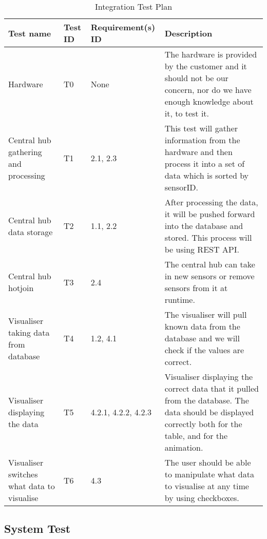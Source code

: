 \documentclass[../document]{subfiles}
\begin{document}
\begin{table}[H]
\caption{Integration Test Plan}
\centering
\begin{tabularx}{\textwidth}{|L{2cm}|l|L{2.2cm}|X|}
	\hline
	Test name
	&Test ID
	&Requirement(s) ID
	&Description
	\\ \hline Hardware
	&T0
	&None
	&The hardware is provided by the customer and it should not be our concern, nor do we have enough knowledge about it, to test it.
	\\ \hline Central hub gathering and processing
	&T1
	&2.1, 2.3
	&This test will gather information from the hardware and then process it into a set of data which is sorted by sensorID.
	\\ \hline Central hub data storage
	&T2
	&1.1, 2.2
	&After processing the data, it will be pushed forward into the database and stored. This process will be using REST \gls{API}.
	\\ \hline Central hub hotjoin
	&T3
	&2.4
	&The central hub can take in new sensors or remove sensors from it at runtime.
	\\ \hline Visualiser taking data from database
	&T4
	&1.2, 4.1
	&The visualiser will pull known data from the database and we will check if the values are correct.
	\\ \hline Visualiser displaying the data
	&T5
	&4.2.1, 4.2.2, 4.2.3
	&Visualiser displaying the correct data that it pulled from the database. The data should be displayed correctly both for the table, and for the animation.
	\\ \hline Visualiser switches what data to visualise
	&T6
	&4.3
	&The user should be able to manipulate what data to visualise at any time by using checkboxes.
	\\ \hline 
\end{tabularx}
\end{table}

\subsection{System Test}
\end{document}
